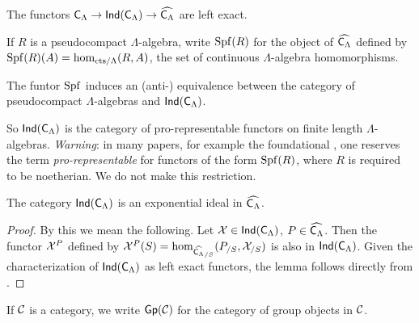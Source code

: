 \begin{lemma}\label{lem:ind-cat-left-exact}
The functors $\mathsf{C}_\Lambda \to \operatorname{\mathsf{Ind}}(\mathsf{C}_\Lambda) \to \widehat{\mathsf{C}_\Lambda}$ 
are left exact.
\end{lemma}

If $R$ is a pseudocompact $\Lambda$-algebra, write $\operatorname{Spf}(R)$ for the object of 
$\widehat{\mathsf{C}_\Lambda}$ defined by $\operatorname{Spf}(R)(A)=\hom_{\mathrm{cts}/\Lambda}(R,A)$, 
the set of continuous $\Lambda$-algebra homomorphisms. 

\begin{lemma}
The funtor $\operatorname{Spf}$ induces an (anti-) equivalence between the category of 
pseudocompact $\Lambda$-algebras and $\operatorname{\mathsf{Ind}}(\mathsf{C}_\Lambda)$. 
\end{lemma}

So $\operatorname{\mathsf{Ind}}(\mathsf{C}_\Lambda)$ is the category of pro-representable 
functors on finite length $\Lambda$-algebras. \emph{Warning}: in many papers, 
for example the foundational \cite{mazur-1995}, one reserves the term 
\emph{pro-representable} for functors of the form $\operatorname{Spf}(R)$, where $R$ is 
required to be noetherian. We do not make this restriction. 

\begin{lemma}\label{thm:exponential-ideal}
The category $\operatorname{\mathsf{Ind}}(\mathsf{C}_\Lambda)$ is an exponential ideal in 
$\widehat{\mathsf{C}_\Lambda}$. 
\end{lemma}
\begin{proof}
By this we mean the following. Let $\mathcal{X}\in \operatorname{\mathsf{Ind}}(\mathsf{C}_\Lambda)$, 
$P\in \widehat{\mathsf{C}_\Lambda}$. Then the functor $\mathcal{X}^P$ defined by 
$\mathcal{X}^P(S) = \hom_{\widehat{\mathsf{C}_\Lambda}_{/S}}(P_{/S},\mathcal{X}_{/S})$ 
is also in $\operatorname{\mathsf{Ind}}(\mathsf{C}_\Lambda)$. Given the characterization of 
$\operatorname{\mathsf{Ind}}(\mathsf{C}_\Lambda)$ as left exact functors, the lemma follows directly from 
\cite[4.2.3]{johnstone-2002}. 
\end{proof}

If $\mathcal{C}$ is a category, we write $\operatorname{\mathsf{Gp}}(\mathcal{C})$ for the category of group 
objects in $\mathcal{C}$. 

